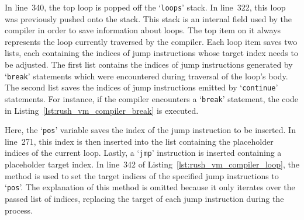 In line~340, the top loop is popped off the `\texttt{loops}' stack.
In line~322, this loop was previously pushed onto the  stack.
This stack is an internal field used by the compiler in order to save information about loops.
The top item on it always represents the loop currently traversed by the compiler.
Each loop item saves two lists, each containing the indices of jump instructions whose target index needs to be adjusted.
The first list contains the indices of jump instructions generated by `\texttt{break}' statements which were encountered during traversal of the loop's body.
The second list saves the indices of jump instructions emitted by `\texttt{continue}' statements.
For instance, if the compiler encounters a `\texttt{break}' statement, the code in Listing~\ref{lst:rush_vm_compiler_break} is executed.


Here, the `\texttt{pos}' variable saves the index of the jump instruction to be inserted.
In line~271, this index is then inserted into the list containing the placeholder indices of the current loop.
Lastly, a `\texttt{jmp}' instruction is inserted containing a placeholder target index.
In line~342 of Listing~\ref{lst:rush_vm_compiler_loop}, the  method is used to set the target indices of the specified jump instructions to `\texttt{pos}'.
The explanation of this method is omitted because it only iterates over the passed list of indices, replacing the target of each jump instruction during the process.
